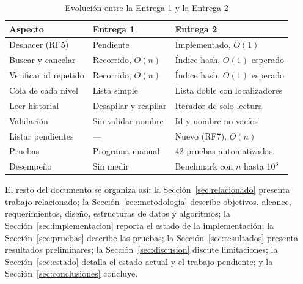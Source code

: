 \begin{table}[t]
  \caption{Evolución entre la Entrega 1 y la Entrega 2}
  \label{tab:cambios}
  \centering
  \footnotesize
  \setlength{\tabcolsep}{4pt}
  \begin{tabular}{L{0.27\columnwidth}L{0.29\columnwidth}L{0.36\columnwidth}}
    \toprule
    Aspecto & Entrega 1 & Entrega 2 \\
    \midrule
    Deshacer (RF5) & Pendiente & Implementado, $O(1)$ \\
    Buscar y cancelar & Recorrido, $O(n)$ & Índice hash, $O(1)$ esperado \\
    Verificar id repetido & Recorrido, $O(n)$ & Índice hash, $O(1)$ esperado \\
    Cola de cada nivel & Lista simple & Lista doble con localizadores \\
    Leer historial & Desapilar y reapilar & Iterador de solo lectura \\
    Validación & Sin validar nombre & Id y nombre no vacíos \\
    Listar pendientes & --- & Nuevo (RF7), $O(n)$ \\
    Pruebas & Programa manual & 42 pruebas automatizadas \\
    Desempeño & Sin medir & Benchmark con $n$ hasta $10^6$ \\
    \bottomrule
  \end{tabular}
\end{table}

El resto del documento se organiza así: la Sección~\ref{sec:relacionado}
presenta trabajo relacionado; la Sección~\ref{sec:metodologia} describe
objetivos, alcance, requerimientos, diseño, estructuras de datos y
algoritmos; la Sección~\ref{sec:implementacion} reporta el estado de la
implementación; la Sección~\ref{sec:pruebas} describe las pruebas; la
Sección~\ref{sec:resultados} presenta resultados preliminares; la
Sección~\ref{sec:discusion} discute limitaciones; la
Sección~\ref{sec:estado} detalla el estado actual y el trabajo pendiente; y
la Sección~\ref{sec:conclusiones} concluye.
